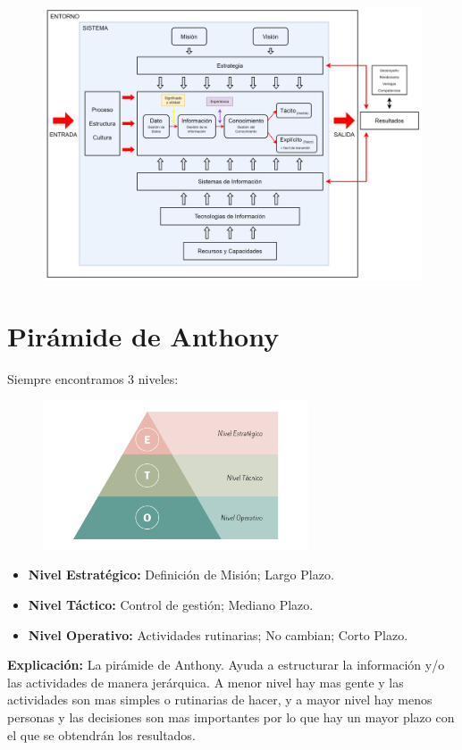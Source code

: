 \documentclass{templateNote}
\begin{document}
\begin{center}
    \begin{figure}[H]
        \centering
        \includegraphics[width=1\textwidth]{img/digramaCompleto.png}
    \end{figure}
\end{center}

\section{Pirámide de Anthony}
\indent
Siempre encontramos 3 niveles:
\begin{figure}[H]
    \centering
    \includegraphics[width=0.7\textwidth]{img/PiramideAnthony.png}

\end{figure}
\begin{itemize}
    \item \textbf{Nivel Estratégico:} Definición de Misión; Largo Plazo.
    \item \textbf{Nivel Táctico:} Control de gestión; Mediano Plazo.
    \item \textbf{Nivel Operativo:} Actividades rutinarias; No cambian; Corto Plazo.
\end{itemize}
\textbf{Explicación:} La pirámide de Anthony. Ayuda a estructurar la información y/o las actividades de manera jerárquica. A menor nivel hay mas gente y las actividades son mas simples o rutinarias de hacer, y a mayor nivel hay menos personas y las decisiones son mas importantes por lo que hay un mayor plazo con el que se obtendrán los resultados.
\end{document}
